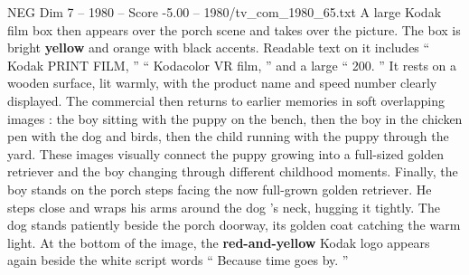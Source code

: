 \begin{textsample}{NEG Dim 7 – 1980 – Score -5.00 – 1980/tv\_com\_1980\_65.txt}
A large Kodak film box then appears over the porch scene and takes over the picture.
The box is bright \textbf{yellow} and orange with black accents.
Readable text on it includes “ Kodak PRINT FILM, ” “ Kodacolor VR film, ” and a large “ 200. ” It rests on a wooden surface, lit warmly, with the product name and speed number clearly displayed.
The commercial then returns to earlier memories in soft overlapping images : the boy sitting with the puppy on the bench, then the boy in the chicken pen with the dog and birds, then the child running with the puppy through the yard.
These images visually connect the puppy growing into a full-sized golden retriever and the boy changing through different childhood moments.
Finally, the boy stands on the porch steps facing the now full-grown golden retriever.
He steps close and wraps his arms around the dog ’s neck, hugging it tightly.
The dog stands patiently beside the porch doorway, its golden coat catching the warm light.
At the bottom of the image, the \textbf{red-and-yellow} Kodak logo appears again beside the white script words “ Because time goes by. ”

\end{textsample}
